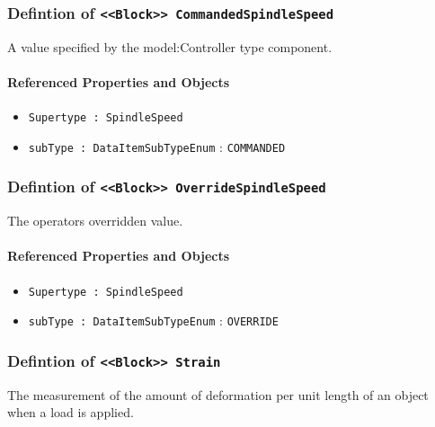 \subsubsection{Defintion of \texttt{<<Block>> CommandedSpindleSpeed}}
  \label{type:CommandedSpindleSpeed}

\FloatBarrier

A value specified by the {model:Controller} type component.

\FloatBarrier
\paragraph{Referenced Properties and Objects}

\begin{itemize}
\item \texttt{Supertype : SpindleSpeed}

\item \texttt{subType : DataItemSubTypeEnum} : \texttt{COMMANDED}

\end{itemize}
\FloatBarrier
\subsubsection{Defintion of \texttt{<<Block>> OverrideSpindleSpeed}}
  \label{type:OverrideSpindleSpeed}

\FloatBarrier

The operators overridden value.

\FloatBarrier
\paragraph{Referenced Properties and Objects}

\begin{itemize}
\item \texttt{Supertype : SpindleSpeed}

\item \texttt{subType : DataItemSubTypeEnum} : \texttt{OVERRIDE}

\end{itemize}
\FloatBarrier
\subsubsection{Defintion of \texttt{<<Block>> Strain}}
  \label{type:Strain}

\FloatBarrier

The measurement of the amount of deformation per unit length of an object when a load is applied.

